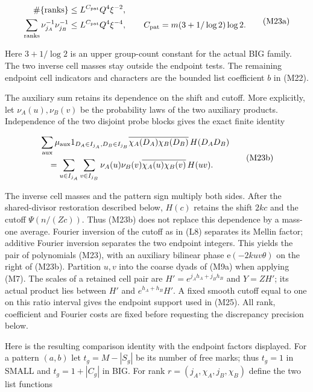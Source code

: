 \[
\begin{aligned}
\#\{\text{ranks}\}&\le L^{C_{\rm pat}}Q^4\xi^{-2},\\
\sum_{\text{ranks}}\nu_{j_A}^{-1}\nu_{j_B}^{-1}
 &\le L^{C_{\rm pat}}Q^4\xi^{-4},\qquad
C_{\rm pat}=m(3+1/\log2)\log2.
\end{aligned}\tag{M23a}
\]

Here \(3+1/\log2\) is an upper group-count constant for the actual BIG
family. The two inverse cell masses stay outside the endpoint tests. The
remaining endpoint cell indicators and characters are the bounded list
coefficient \(b\) in (M22).

The auxiliary sum retains its dependence on the shift and cutoff. More
explicitly, let \(\nu_A(u),\nu_B(v)\) be the probability laws of the two
auxiliary products. Independence of the two disjoint probe blocks gives
the exact finite identity

\[
\begin{aligned}
&\sum_{\rm aux}\mu_{\rm aux}
 1_{D_A\in I_{j_A},D_B\in I_{j_B}}
 \overline{\chi_A(D_A)\chi_B(D_B)}\,H(D_AD_B)\\
&\quad=\sum_{u\in I_{j_A}}\sum_{v\in I_{j_B}}
 \nu_A(u)\nu_B(v)\overline{\chi_A(u)\chi_B(v)}\,H(uv).
\end{aligned}\tag{M23b}
\]

The inverse cell masses and the pattern sign multiply both sides. After
the shared-divisor restoration described below, \(H(c)\) retains the
shift \(2kc\) and the cutoff \(\Psi(n/(Zc))\). Thus (M23b) does not
replace this dependence by a mass-one average. Fourier inversion of the
cutoff as in (L8) separates its Mellin factor; additive Fourier
inversion separates the two endpoint integers. This yields the pair of
polynomials (M23), with an auxiliary bilinear phase
\(\mathrm e(-2kuv\theta)\) on the right of (M23b). Partition \(u,v\)
into the coarse dyads of (M9a) when applying (M7). The scales of a
retained cell pair are \(H'=e^{j_Ah_A+j_Bh_B}\) and \(Y=ZH'\); its
actual product lies between \(H'\) and \(e^{h_A+h_B}H'\). A fixed smooth
cutoff equal to one on this ratio interval gives the endpoint support
used in (M25). All rank, coefficient and Fourier costs are fixed before
requesting the discrepancy precision below.

Here is the resulting comparison identity with the endpoint factors
displayed. For a pattern \((a,b)\) let \(t_g=M-|S_g|\) be its number of
free marks; thus \(t_g=1\) in SMALL and \(t_g=1+|C_g|\) in BIG. For rank
\(r=(j_A,\chi_A,j_B,\chi_B)\) define the two list functions

